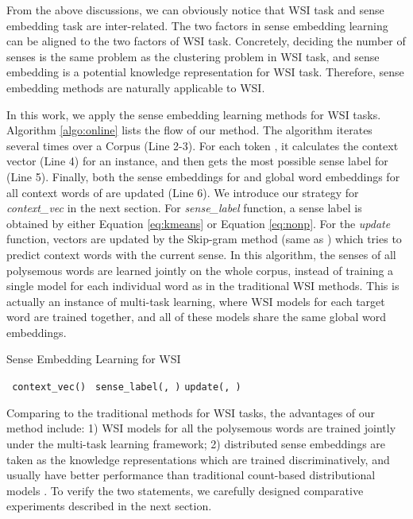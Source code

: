 \documentclass[11pt]{article}
\begin{document}
From the above discussions, we can obviously notice that WSI task and sense embedding task are inter-related. The two factors in sense embedding learning can be aligned to the two factors of WSI task. Concretely, deciding the number of senses is the same problem as the clustering problem in WSI task, and sense embedding is a potential knowledge representation for WSI task.
Therefore, sense embedding methods are naturally applicable to WSI.

In this work, we apply the sense embedding learning methods for WSI tasks. Algorithm \ref{algo:online} lists the flow of our method. The algorithm iterates several times over a Corpus (Line 2-3).
For each token , 
it calculates the context vector  (Line 4) for an instance, 
and then gets the most possible sense label  for  (Line 5). 
Finally, both the sense embeddings for  and global word embeddings for all context words of  are updated (Line 6).
We introduce our strategy for \emph{context\_vec} in the next section.
For \emph{sense\_label} function, a sense label is obtained by either Equation \ref{eq:kmeans} or Equation \ref{eq:nonp}.
For the \emph{update} function, vectors are updated by the Skip-gram method (same as ) which tries to predict context words with the current sense. 
In this algorithm, the senses of all polysemous words are learned jointly on the whole corpus, instead of training a single model for each individual word as in the traditional WSI methods. 
This is actually an instance of multi-task learning, where WSI models for each target word are trained together, and all of these models share the same global word embeddings.

\begin{algorithm}[t]
  \caption{\small{Sense Embedding Learning for WSI}}\label{algo:online}
  \begin{algorithmic}[1]  
        \State\texttt{  context\_vec()}
        \State\texttt{  sense\_label(, )}
        \State\texttt{update(, )}
      \EndFor
    \EndFor
    \EndProcedure
  \end{algorithmic}
\end{algorithm}

Comparing to the traditional methods for WSI tasks, the advantages of our method include: 
1) WSI models for all the polysemous words are trained jointly under the multi-task learning framework;
2) distributed sense embeddings are taken as the knowledge representations which are trained discriminatively, and usually have better performance than traditional count-based distributional models \cite{baroni-dinu-kruszewski:2014:P14-1}.
To verify the two statements, we carefully designed comparative experiments described in the next section.
\end{document}
